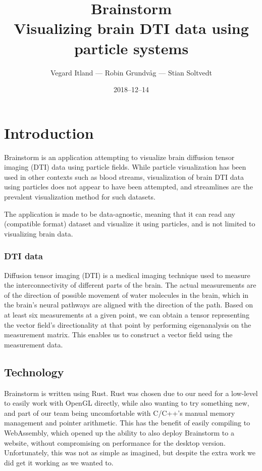 \documentclass{article}
\title{%
Brainstorm\\
\large Visualizing brain DTI data using particle systems}
\author{Vegard Itland --- Robin Grundvåg --- Stian Soltvedt}
\date{2018--12--14}
\begin{document}
\maketitle
{}

\section*{Introduction}

Brainstorm is an application attempting to visualize brain diffusion tensor imaging (DTI) data using particle fields. While particle visualization has been used in other contexts such as blood streams, visualization of brain DTI data using particles does not appear to have been attempted, and streamlines are the prevalent visualization method for such datasets.

The application is made to be data-agnostic, meaning that it can read any (compatible format) dataset and visualize it using particles, and is not limited to visualizing brain data.

\subsubsection*{DTI data}

Diffusion tensor imaging (DTI) is a medical imaging technique used to measure the interconnectivity of different parts of the brain. The actual measurements are of the direction of possible movement of water molecules in the brain, which in the brain's neural pathways are aligned with the direction of the path. Based on at least six measurements at a given point, we can obtain a tensor representing the vector field's directionality at that point by performing eigenanalysis on the measurement matrix. This enables us to construct a vector field using the measurement data.

\subsection*{Technology}

Brainstorm is written using Rust. Rust was chosen due to our need for a low-level to easily work with OpenGL directly, while also wanting to try something new, and part of our team being uncomfortable with C/C++'s manual memory management and pointer arithmetic. This has the benefit of easily compiling to WebAssembly, which opened up the ability to also deploy Brainstorm to a website, without compromising on performance for the desktop version. Unfortunately, this was not as simple as imagined, but despite the extra work we did get it working as we wanted to.
\end{document}
